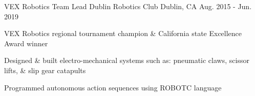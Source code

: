 \begin{cventries}

 \cventry
 {VEX Robotics Team Lead} %
 {Dublin Robotics Club} %
 {Dublin, CA} %
 {Aug. 2015 - Jun. 2019} %
 { %
 \begin{cvitems}
 \item {VEX Robotics regional tournament champion \& California state Excellence Award winner}
 \item {Designed \& built electro-mechanical systems such as: pneumatic claws, scissor lifts, \& slip gear catapults}
 \item {Programmed autonomous action sequences using ROBOTC language}
 \end{cvitems}
 }













\end{cventries}